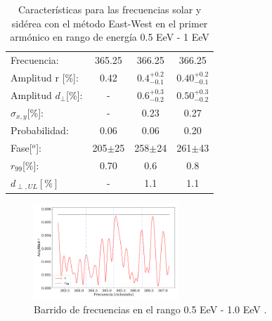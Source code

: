\begin{table}[H]
        \begin{small}
            \begin{center}
                \begin{tabular}[c]{l|c||c|c}
                    Frecuencia:             & 365.25	    & 366.25		& 366.25\cite{Aab_2020}\\
                    Amplitud r [\%]:        & 0.42          & $0.4^{+0.2}_{-0.1}$ 	        & $0.40^{+0.2}_{-0.1}$\footnotemark[2] \\
                    Amplitud $d_\perp$[\%]: & -             & $0.6^{+0.3}_{-0.2}$           & $0.50^{+0.3}_{-0.2}$\\
                    $\sigma_{x,y}$[\%]:     & -	            & 0.23	        & 0.27       \\
                    Probabilidad:           & 0.06          & 0.06	        & 0.20\\
                    Fase[$^o$]:             & 205$\pm$25	& 258$\pm$24	& 261$\pm$43\footnotemark[3]  \\
                    $r_{99}$[\%]:           & 0.70	        & 0.6          & 0.8\footnotemark[2] \\
                    $d_{\perp,UL}[\%]$      & -             & 1.1          & 1.1\\
                \end{tabular}
            \end{center}
        \end{small}
        \caption{Características para las frecuencias solar y sidérea con el método East-West en el primer armónico en rango de energía 0.5 EeV - 1 EeV}
        \label{tab:solar}
    \end{table}


    \begin{figure}[H]
        \begin{small}
            \begin{center}
                \includegraphics[width=0.485\textwidth]{plot_bin_2_barrido_v2.pdf}
            \end{center}
            \caption{Barrido de frecuencias en el  rango 0.5 EeV - 1.0 EeV .}
            \label{fig:segundo_barrido}
        \end{small}
    \end{figure}    


